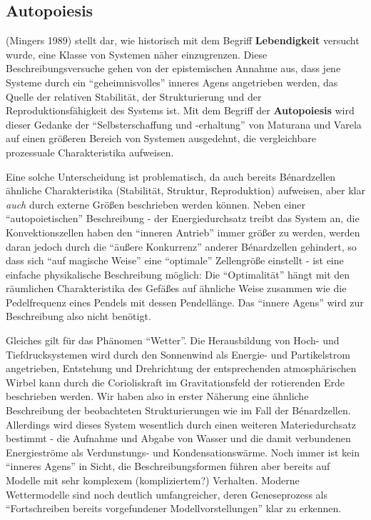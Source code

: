 \documentclass[11pt,a4paper]{article}
\begin{document}
\hypertarget{autopoiesis}{%
\subsection{Autopoiesis}\label{autopoiesis}}

(Mingers 1989) stellt dar, wie historisch mit dem Begriff
\textbf{Lebendigkeit} versucht wurde, eine Klasse von Systemen näher
einzugrenzen. Diese Beschreibungsversuche gehen von der epistemischen
Annahme aus, dass jene Systeme durch ein ``geheimnisvolles'' inneres
Agens angetrieben werden, das Quelle der relativen Stabilität, der
Strukturierung und der Reproduktionsfähigkeit des Systems ist. Mit dem
Begriff der \textbf{Autopoiesis} wird dieser Gedanke der
``Selbsterschaffung und -erhaltung'' von Maturana und Varela auf einen
größeren Bereich von Systemen ausgedehnt, die vergleichbare prozessuale
Charakteristika aufweisen.

Eine solche Unterscheidung ist problematisch, da auch bereits
Bénardzellen ähnliche Charakteristika (Stabilität, Struktur,
Reproduktion) aufweisen, aber klar \emph{auch} durch externe Größen
beschrieben werden können. Neben einer ``autopoietischen'' Beschreibung
- der Energiedurchsatz treibt das System an, die Konvektionszellen haben
den ``inneren Antrieb'' immer größer zu werden, werden daran jedoch
durch die ``äußere Konkurrenz'' anderer Bénardzellen gehindert, so dass
sich ``auf magische Weise'' eine ``optimale'' Zellengröße einstellt -
ist eine einfache physikalische Beschreibung möglich: Die
``Optimalität'' hängt mit den räumlichen Charakteristika des Gefäßes auf
ähnliche Weise zusammen wie die Pedelfrequenz eines Pendels mit dessen
Pendellänge. Das ``innere Agens'' wird zur Beschreibung also nicht
benötigt.

Gleiches gilt für das Phänomen ``Wetter''. Die Herausbildung von Hoch-
und Tiefdrucksystemen wird durch den Sonnenwind als Energie- und
Partikelstrom angetrieben, Entstehung und Drehrichtung der
entsprechenden atmosphärischen Wirbel kann durch die Corioliskraft im
Gravitationsfeld der rotierenden Erde beschrieben werden. Wir haben also
in erster Näherung eine ähnliche Beschreibung der beobachteten
Strukturierungen wie im Fall der Bénardzellen. Allerdings wird dieses
System wesentlich durch einen weiteren Materiedurchsatz bestimmt - die
Aufnahme und Abgabe von Wasser und die damit verbundenen Energieströme
als Verdunstungs- und Kondensationswärme. Noch immer ist kein ``inneres
Agens'' in Sicht, die Beschreibungsformen führen aber bereits auf
Modelle mit sehr komplexem (kompliziertem?) Verhalten. Moderne
Wettermodelle sind noch deutlich umfangreicher, deren Geneseprozess als
``Fortschreiben bereits vorgefundener Modellvorstellungen'' klar zu
erkennen.
\end{document}
